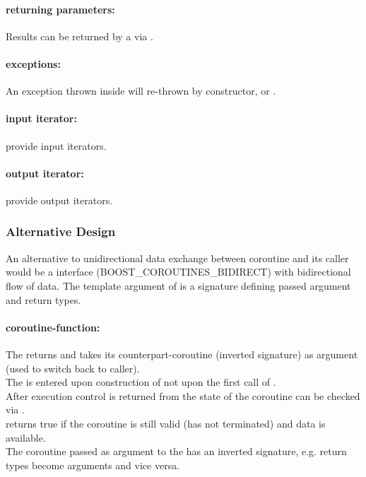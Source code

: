 \paragraph*{returning parameters:}
Results can be returned by a \corofunction via \pushcoroop.\\

\paragraph*{exceptions:}
An exception thrown inside \corofunction will re-thrown by \pullcoro
constructor, \pullcoroop or \pushcoroop.

\paragraph*{input iterator:}
\pullcoro provide input iterators.

\paragraph*{output iterator:}
\pushcoro provide output iterators.


\subsubsection*{Alternative Design}
An alternative to unidirectional data exchange between coroutine and its caller
would be a interface (BOOST\_COROUTINES\_BIDIRECT) with bidirectional flow of
data. The template argument of \coro is a signature defining passed argument and
return types.

\paragraph*{coroutine-function:}
The \corofunction returns  and takes its counterpart-coroutine
(inverted signature) as argument (used to switch back to caller).\\
The \corofunction is entered upon construction of \coro not upon the first call of
\coroop.\\
After execution control is returned from \corofunction the state of the
coroutine can be checked via \corobool.\\
\corobool returns true if the coroutine is still valid (\corofunction has not
terminated) and data is available.\\
The coroutine passed as argument to the \corofunction has an inverted
signature, e.g. return types become arguments and vice versa.

